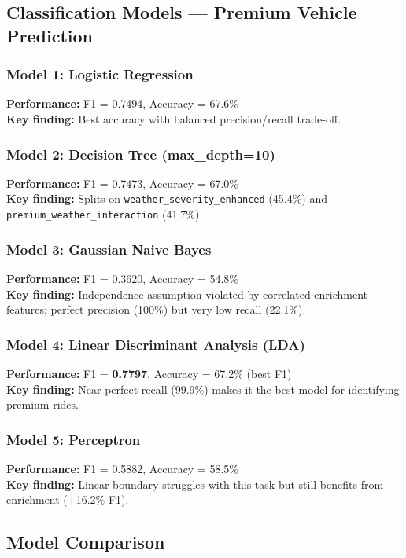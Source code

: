 \documentclass[12pt,a4paper]{article}
\begin{document}
\subsection{Classification Models --- Premium Vehicle Prediction}

\subsubsection*{Model 1: Logistic Regression}
\textbf{Performance:} F1 = 0.7494, Accuracy = 67.6\%\\
\textbf{Key finding:} Best accuracy with balanced precision/recall trade-off.

\subsubsection*{Model 2: Decision Tree (max\_depth=10)}
\textbf{Performance:} F1 = 0.7473, Accuracy = 67.0\%\\
\textbf{Key finding:} Splits on \texttt{weather\_severity\_enhanced} (45.4\%) and \texttt{premium\_weather\_interaction} (41.7\%).

\subsubsection*{Model 3: Gaussian Naive Bayes}
\textbf{Performance:} F1 = 0.3620, Accuracy = 54.8\%\\
\textbf{Key finding:} Independence assumption violated by correlated enrichment features; perfect precision (100\%) but very low recall (22.1\%).

\subsubsection*{Model 4: Linear Discriminant Analysis (LDA)}
\textbf{Performance:} F1 = \textbf{0.7797}, Accuracy = 67.2\% (best F1)\\
\textbf{Key finding:} Near-perfect recall (99.9\%) makes it the best model for identifying premium rides.

\subsubsection*{Model 5: Perceptron}
\textbf{Performance:} F1 = 0.5882, Accuracy = 58.5\%\\
\textbf{Key finding:} Linear boundary struggles with this task but still benefits from enrichment (+16.2\% F1).

\subsection{Model Comparison}
\end{document}
